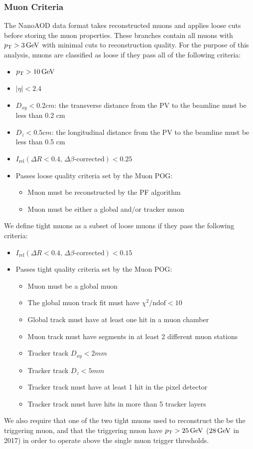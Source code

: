 \subsubsection{Muon Criteria} \label{sec:ana_muons}
The NanoAOD data format takes reconstructed muons and applies loose cuts before storing the muon properties. These branches contain all muons with $p_{\mathrm{T}}>3\,\text{Ge\hspace{-.08em}V}$ with minimal cuts to reconstruction quality. For the purpose of this analysis, muons are classified as loose if they pass all of the following criteria:
\begin{itemize}
	\item $p_{\mathrm{T}}>10\,\text{Ge\hspace{-.08em}V}$
	\item $|\eta|<2.4$
	\item $D_{xy}<0.2\unit{cm}$: the transverse distance from the PV to the beamline must be less than 0.2 cm
	\item $D_{z}<0.5\unit{cm}$: the longitudinal distance from the PV to the beamline must be less than 0.5 cm
	\item $I_\text{rel}(\Delta R<0.4,\,\Delta\beta\text{-corrected})<0.25$
	\item Passes loose quality criteria set by the Muon POG:
	\begin{itemize}
		\item Muon must be reconstructed by the PF algorithm
		\item Muon must be either a global and/or tracker muon
	\end{itemize}
\end{itemize}
We define tight muons as a subset of loose muons if they pass the following criteria:
\begin{itemize}
	\item $I_\text{rel}(\Delta R<0.4,\,\Delta\beta\text{-corrected})<0.15$
	\item Passes tight quality criteria set by the Muon POG:
	\begin{itemize}
		\item Muon must be a global muon
		\item The global muon track fit must have $\chi^2/\text{ndof}<10$
		\item Global track must have at least one hit in a muon chamber %
		\item Muon track must have segments in at least 2 different muon stations %
		\item Tracker track $D_{xy}<2\unit{mm}$
		\item Tracker track $D_{z}<5\unit{mm}$
		\item Tracker track must have at least 1 hit in the pixel detector
		\item Tracker track must have hits in more than 5 tracker layers
	\end{itemize}
\end{itemize}
We also require that one of the two tight muons used to reconstruct the \PZ be the triggering muon, and that the triggering muon have $p_{\mathrm{T}}>25\,\text{Ge\hspace{-.08em}V}$ ($28\,\text{Ge\hspace{-.08em}V}$ in 2017) in order to operate above the single muon trigger \pt thresholds.

